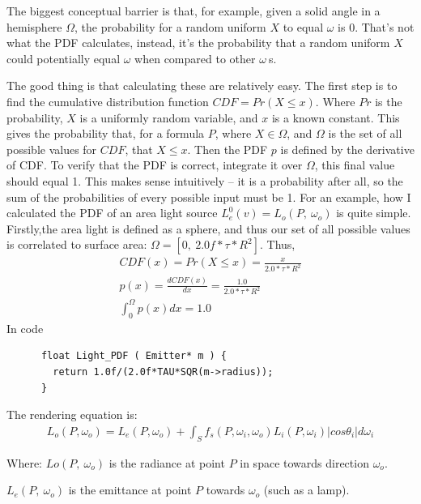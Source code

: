\message{ !name(test.tex)}\documentclass{article}
\begin{document}
    The
    biggest conceptual barrier is that, for example, given a solid angle in a hemisphere $\Omega$, the probability for a random uniform $X$ to equal $\omega$ is 0. That's not what the PDF calculates, instead, it's the
    probability that a random uniform $X$ could potentially equal $\omega$ when compared to other $\omega\:$s.
    

    The good thing is that calculating these are relatively easy. The first step is to
    find the cumulative distribution function $CDF = Pr(X \leq x)$. Where $Pr$
    is the probability, $X$ is a uniformly random variable, and $x$ is a known
    constant. This gives the probability that, for a formula
    $P$, where $X \in \Omega$, and $\Omega$ is the set of all possible values
    for $CDF$,
    that $X \leq x$. Then the PDF $p$ is defined by the derivative of CDF. To verify that the PDF is correct, integrate it
    over $\Omega$, this final value should equal 1. This makes sense intuitively
    -- it is a probability after all, so the sum of the probabilities of every
    possible input must be 1.
    For an example, how I calculated the PDF of an area light source
      $L^0_e(v) = L_o(P,\:\omega_o)$ 
    is quite simple. Firstly,the area light is defined as a sphere, and thus our
    set of all possible values is correlated to surface area:
    $\Omega = [0,\:2.0f*\tau*R^2]$. Thus,
    \begin{align}
      CDF(x) = Pr(X \leq x) = \frac{x}{2.0*\tau*R^2}\\
      p(x) = \frac{dCDF(x)}{dx} = \frac{1.0}{2.0*\tau*R^2}\\
      \int_0^{\Omega}p(x)dx = 1.0
    \end{align}
    In code
    \begin{lstlisting}
      float Light_PDF ( Emitter* m ) {
        return 1.0f/(2.0f*TAU*SQR(m->radius));
      }
    \end{lstlisting}
    
    
  
  The rendering equation is:
  \begin{align}
    L_o(P, \omega_o) = L_e(P, \omega_o) + \int_{S}f_s(P, \omega_i,
    \omega_o) L_i(P, \omega_i) \vert cos\theta_i\vert d\omega_i
  \end{align}
  
  Where:
  	 $Lo(P,\:\omega_o)$ is the radiance at point $P$ in space towards direction $\omega_o$. 
  	 
  	 $L_e(P,\:\omega_o)$ is the emittance at point $P$ towards $\omega_o$ (such as a lamp).
  	 
\end{document}
